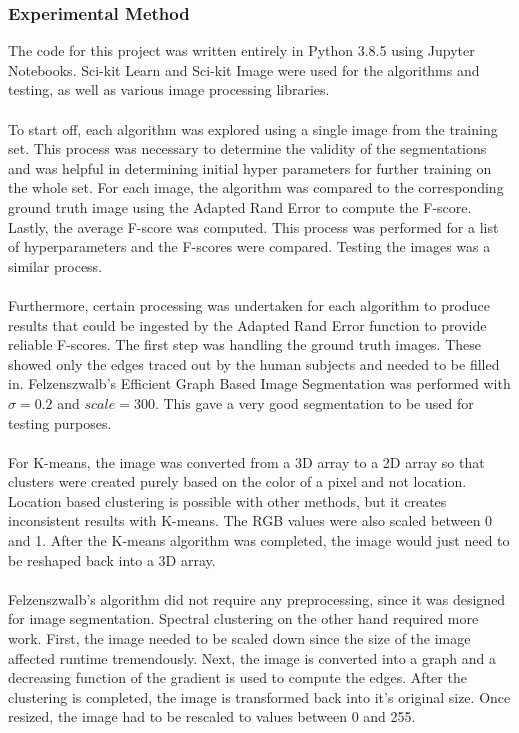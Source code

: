 \documentclass[12pt]{extarticle}
\begin{document}
    \subsubsection{Experimental Method}
      The code for this project was written entirely in Python 3.8.5 using 
      Jupyter Notebooks. Sci-kit Learn and Sci-kit Image were used for the 
      algorithms and testing, as well as various image processing libraries.
      \\
      \\
      To start off, each algorithm was explored using a single image from the
      training set. This process was necessary to determine the validity of 
      the segmentations and was helpful in determining initial hyper parameters 
      for further training on the whole set. For each image, the algorithm was 
      compared to the corresponding ground truth image using the Adapted Rand Error 
      to compute the F-score. Lastly, the average F-score was computed. This 
      process was performed for a list of hyperparameters and the F-scores were
      compared. Testing the images was a similar process.
      \\
      \\
      Furthermore, certain processing was undertaken for each algorithm to produce
      results that could be ingested by the Adapted Rand Error function to provide 
      reliable F-scores. The first step was handling the ground truth images.
      These showed only the edges traced out by the human subjects and needed
      to be filled in. Felzenszwalb's Efficient Graph Based Image Segmentation
      was performed with $\sigma = 0.2$ and $scale = 300$. This gave a very good
      segmentation to be used for testing purposes.
      \\
      \\
      For K-means, the image was converted from a 3D array to a 2D array so that
      clusters were created purely based on the color of a pixel and not location.
      Location based clustering is possible with other methods, but it creates
      inconsistent results with K-means. The RGB values were also scaled between
      0 and 1. After the K-means algorithm was completed, the image would just need
      to be reshaped back into a 3D array.
      \\
      \\
      Felzenszwalb's algorithm did not require any preprocessing, since it was
      designed for image segmentation.
      Spectral clustering on the other hand required more work. First, the 
      image needed to be scaled down since the size of the image affected
      runtime tremendously. Next, the image is converted into a graph and 
      a decreasing function of the gradient is used to compute the edges.
      After the clustering is completed, the image is transformed back
      into it's original size. Once resized, the image had to be rescaled
      to values between 0 and 255.
\end{document}
